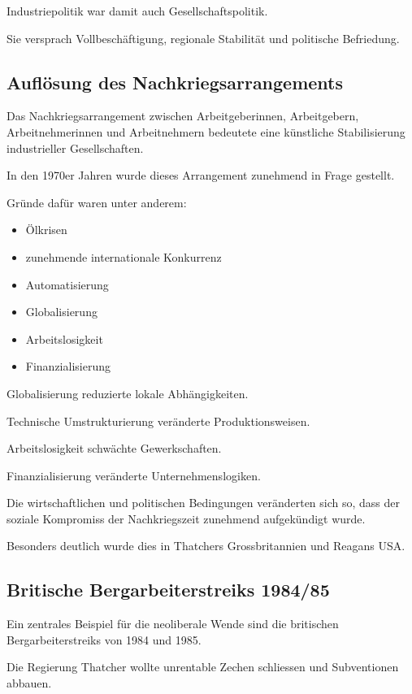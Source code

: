 Industriepolitik war damit auch Gesellschaftspolitik.

Sie versprach Vollbeschäftigung,
regionale Stabilität
und politische Befriedung.

\subsection{Auflösung des Nachkriegsarrangements}

Das Nachkriegsarrangement
zwischen Arbeitgeberinnen,
Arbeitgebern,
Arbeitnehmerinnen
und Arbeitnehmern
bedeutete eine künstliche Stabilisierung
industrieller Gesellschaften.

In den 1970er Jahren
wurde dieses Arrangement zunehmend in Frage gestellt.

Gründe dafür waren unter anderem:

\begin{itemize}
\item Ölkrisen
\item zunehmende internationale Konkurrenz
\item Automatisierung
\item Globalisierung
\item Arbeitslosigkeit
\item Finanzialisierung
\end{itemize}

Globalisierung reduzierte lokale Abhängigkeiten.

Technische Umstrukturierung
veränderte Produktionsweisen.

Arbeitslosigkeit schwächte Gewerkschaften.

Finanzialisierung veränderte Unternehmenslogiken.

Die wirtschaftlichen und politischen Bedingungen
veränderten sich so,
dass der soziale Kompromiss der Nachkriegszeit
zunehmend aufgekündigt wurde.

Besonders deutlich wurde dies
in Thatchers Grossbritannien
und Reagans USA.

\subsection{Britische Bergarbeiterstreiks 1984/85}

Ein zentrales Beispiel für die neoliberale Wende
sind die britischen Bergarbeiterstreiks
von 1984 und 1985.

Die Regierung Thatcher wollte
unrentable Zechen schliessen
und Subventionen abbauen.

